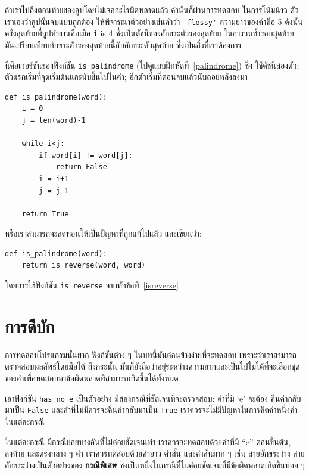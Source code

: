 ถ้าเราไปถึงตอนท้ายของลูปโดยไม่เจออะไรผิดพลาดแล้ว คำนั้นก็ผ่านการทดสอบ ในการโน้มน้าว
ตัวเราเองว่าลูปนั้นจบแบบถูกต้อง ให้พิจารณาตัวอย่างเช่นคำว่า \verb"'flossy'" ความยาวของคำคือ 5
ดังนั้น ครั้งสุดท้ายที่ลูปทำงานคือเมื่อ {\tt i} is 4 ซึ่งเป็นดัชนีของอักขระตัวรองสุดท้าย
ในการวนซ้ำรอบสุดท้าย มันเปรียบเทียบอักขระตัวรองสุดท้ายนี้กับอักขระตัวสุดท้าย 
ซึ่งเป็นสิ่งที่เราต้องการ


นี่คือเวอร์ชันของฟังก์ชัน \verb"is_palindrome" (ไปดูแบบฝึกหัดที่~\ref{palindrome}) ซึ่ง
ใช้ดัชนีสองตัว; ตัวแรกเริ่มที่จุดเริ่มต้นและนับขึ้นไปในคำ; อีกตัวเริ่มที่ตอนจบแล้วนับถอยหลังลงมา

\begin{verbatim}
def is_palindrome(word):
    i = 0
    j = len(word)-1

    while i<j:
        if word[i] != word[j]:
            return False
        i = i+1
        j = j-1

    return True
\end{verbatim}

หรือเราสามารถจะลดทอนให้เป็นปัญหาที่ถูกแก้ไปแล้ว และเขียนว่า:

\begin{verbatim}
def is_palindrome(word):
    return is_reverse(word, word)
\end{verbatim}
%
โดยการใช้ฟังก์ชัน \verb"is_reverse" จากหัวข้อที่~\ref{isreverse}


\section{การดีบัก}

การทดสอบโปรแกรมนั้นยาก ฟังก์ชันต่าง ๆ ในบทนี้มันค่อนข้างง่ายที่จะทดสอบ 
เพราะว่าเราสามารถตรวจสอบผลลัพธ์โดยมือได้ ถึงกระนั้น 
มันก็ยังถือว่าอยู่ระหว่างความยากและเป็นไปไม่ได้ที่จะเลือกชุดของคำเพื่อทดสอบหาข้อผิดพลาดที่สามารถเกิดขึ้นได้ทั้งหมด

เอาฟังก์ชัน \verb"has_no_e" เป็นตัวอย่าง มีสองกรณีที่ชัดเจนที่จะตรวจสอบ: คำที่มี `e' จะต้อง
คืนค่ากลับมาเป็น {\tt False} และคำที่ไม่มีควรจะคืนค่ากลับมาเป็น {\tt True} 
เราควรจะไม่มีปัญหาในการคิดคำหนึ่งคำในแต่ละกรณี

ในแต่ละกรณี มีกรณีย่อยบางอันที่ไม่ค่อยชัดเจนเท่า เราควรจะทดสอบด้วยคำที่มี ``e'' ตอนขึ้นต้น,
ลงท้าย และตรงกลาง ๆ คำ เราควรทดสอบด้วยคำยาว คำสั้น และคำสั้นมาก ๆ เช่น สายอักขระว่าง
สายอักขระว่างเป็นตัวอย่างของ {\bf กรณีพิเศษ} 
ซึ่งเป็นหนึ่งในกรณีที่ไม่ค่อยชัดเจนที่มีข้อผิดพลาดเกิดขึ้นบ่อย ๆ

